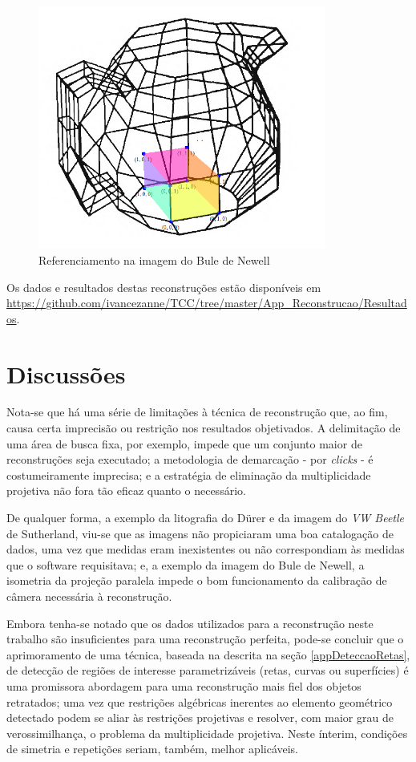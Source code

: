 			
			\begin{figure}[!htb]
				\centering
				\includegraphics[height=8cm]{imagens/printBuleDispensada.png}
				\caption{Referenciamento na imagem do Bule de Newell}
				\label{imagemBuleDispensada}
			\end{figure}
			
			Os dados e resultados destas reconstruções estão disponíveis em \url{https://github.com/ivancezanne/TCC/tree/master/App_Reconstrucao/Resultados}.
			
		\section{Discussões}
			\label{secaoDiscussoes}
			
			Nota-se que há uma série de limitações à técnica de reconstrução que, ao fim, causa certa imprecisão ou restrição nos resultados objetivados. A delimitação de uma área de busca fixa, por exemplo, impede que um conjunto maior de reconstruções seja executado; a metodologia de demarcação - por \textit{clicks} - é costumeiramente imprecisa; e a estratégia de eliminação da multiplicidade projetiva não fora tão eficaz quanto o necessário.
			
			De qualquer forma, a exemplo da litografia do Dürer e da imagem do \textit{VW Beetle} de Sutherland, viu-se que as imagens não propiciaram uma boa catalogação de dados, uma vez que medidas eram inexistentes ou não correspondiam às medidas que o software requisitava; e, a exemplo da imagem do Bule de Newell, a isometria da projeção paralela impede o bom funcionamento da calibração de câmera necessária à reconstrução.
			
			Embora tenha-se notado que os dados utilizados para a reconstrução neste trabalho são insuficientes para uma reconstrução perfeita, pode-se concluir que o aprimoramento de uma técnica, baseada na descrita na seção \ref{appDeteccaoRetas}, de detecção de regiões de interesse parametrizáveis (retas, curvas ou superfícies) é uma promissora abordagem para uma reconstrução mais fiel dos objetos retratados; uma vez que restrições algébricas inerentes ao elemento geométrico detectado podem se aliar às restrições projetivas e resolver, com maior grau de verossimilhança, o problema da multiplicidade projetiva. Neste ínterim, condições de simetria e repetições seriam, também, melhor aplicáveis.
			
